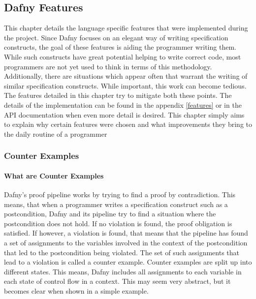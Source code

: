\subsection{Dafny Features}
This chapter details the language specific features that were implemented during the project. Since Dafny focuses on an elegant way of writing specification constructs, the goal of these features is  aiding the programmer writing them. While such constructs have great potential helping to write correct code, most programmers are not yet used to think in terms of this methodology. Additionally, there are situations which appear often that warrant the writing of similar specification constructs. While important, this work can become tedious. The features detailed in this chapter try to mitigate both these points. \newline
The details of the implementation can be found in the appendix \ref{features} or in the API documentation when even more detail is desired. This chapter simply aims to explain why certain features were chosen and what improvements they bring to the daily routine of a programmer \newline

\subsubsection{Counter Examples}
\paragraph{What are Counter Examples}
Dafny's proof pipeline works by trying to find a proof by contradiction. This means, that when a programmer writes a specification construct such as a postcondition, Dafny and its pipeline try to find a situation where the postcondition does not hold. If no violation is found, the proof obligation is satisfied. \newline
If however, a violation is found, that means that the pipeline has found a set of assignments to the variables involved in the context of the postcondition that led to the postcondition being violated. The set of such assignments that lead to a violation is called a counter example. \newline
Counter examples are split up into different states. This means, Dafny includes all assignments to each variable in each state of control flow in a context. This may seem very abstract, but it becomes clear when shown in a simple example. \newline

